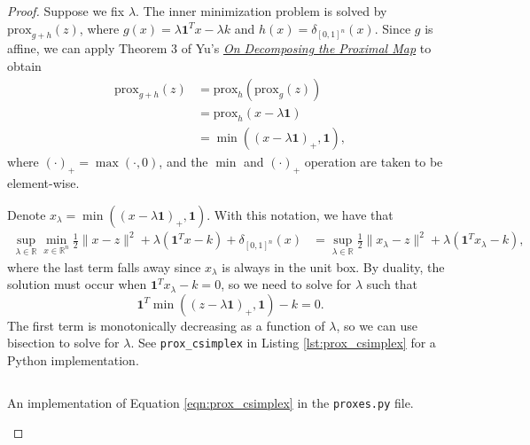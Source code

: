 \documentclass[11pt]{amsart}
\begin{document}
\begin{enumerate}
\begin{enumerate}
  \begin{proof}
    Suppose we fix $\lambda$. The inner minimization problem is solved by
    $\mbox{prox}_{g + h}(z)$, where $g(x) = \lambda\mathbf{1}^Tx - \lambda k$
    and $h\left(x\right) = \delta_{[0,1]^n}\left(x\right)$. Since $g$ is affine,
    we can apply Theorem 3 of Yu's
    \href{http://papers.neurips.cc/paper/4863-on-decomposing-the-proximal-map}{\emph{On
        Decomposing the Proximal Map}} to obtain
    \begin{align*}
      \mbox{prox}_{g + h}(z)
      &= \mbox{prox}_{h}\left(\mbox{prox}_{g}(z)\right) \\
      &= \mbox{prox}_{h}\left(x - \lambda\mathbf{1}\right) \\
      &= \min\left(\left(x - \lambda\mathbf{1}\right)_+, \mathbf{1}\right),
    \end{align*}
    where $\left(\cdot\right)_+ = \max\left(\cdot, 0\right)$, and the $\min$ and
    $\left(\cdot\right)_+$ operation are taken to be element-wise.

    Denote
    $x_\lambda = \min\left(\left(x - \lambda\mathbf{1}\right)_+,
      \mathbf{1}\right)$. With this notation, we have that
    \begin{align*}
      \sup_{\lambda \in \mathbb{R}}\min_{x \in \mathbb{R}^n}
      \frac{1}{2}\|x-z\|^2 +
      \lambda\left(\mathbf{1}^Tx - k \right) +
      \delta_{[0,1]^n}\left(x\right)
      &= \sup_{\lambda \in \mathbb{R}}
        \frac{1}{2}\|x_\lambda-z\|^2 +
        \lambda\left(\mathbf{1}^Tx_\lambda - k \right),
    \end{align*}
    where the last term falls away since $x_\lambda$ is always in the unit
    box. By duality, the solution must occur when
    $\mathbf{1}^Tx_\lambda - k = 0$, so we need to solve for $\lambda$ such that
    \begin{equation*}
      \mathbf{1}^T\min\left(\left(z - \lambda\mathbf{1}\right)_+, \mathbf{1}\right) - k = 0.
    \end{equation*}
    The first term is monotonically decreasing as a function of $\lambda$, so we
    can use bisection to solve for $\lambda$. See \texttt{prox\_csimplex} in
    Listing \ref{lst:prox_csimplex} for a Python implementation.
    
    \begin{listing}
      \small
      \inputminted{python}{proxes.py}
      \caption{An implementation of Equation \ref{eqn:prox_csimplex} in the \texttt{proxes.py} file.}
      \label{lst:prox_csimplex}
    \end{listing}
  \end{proof}
  

\end{enumerate}
\end{enumerate}
\end{document}
